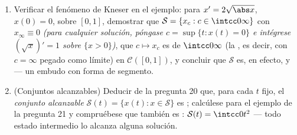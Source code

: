 \begin{problem}[{Problema de fin de semana --- existencia de soluciones
de
$x' = f(t, x)$ sin hipótesis de Lipschitz}]
\begin{enumerate}[resume]
        demostraremos.) \item Verificar el fenómeno de Kneser en el
        ejemplo: para $x' =
        2\sqrt{\abs x}$, $x(0) = 0$, sobre $[0, 1]$, demostrar que
        $\mathcal S = \{x_c : c \in \intcc0\infty\}$ con
        $x_\infty \equiv 0$ \emph{(para cualquier solución, póngase $c =
        \sup\{t : x(t) = 0\}$ e intégrese $(\sqrt x)' = 1$ sobre
        $\{x > 0\}$)}, que $c \mapsto x_c$ es
         de $\intcc0\infty$
        (la , es decir, con $c = \infty$ pegado como límite) en
        $\mathcal C([0,1])$, y concluir que $\mathcal S$ es, en efecto,
         y
         --- un embudo con
        forma de segmento. \item (Conjuntos alcanzables) Deducir de la
        pregunta 20 que, para cada $t$ fijo, el \emph{conjunto
        alcanzable} $\mathcal S(t) =
        \{x(t) : x \in \mathcal S\}$ es
        ; calcúlese para el
        ejemplo de la pregunta 21 y compruébese que también es
        :
        $\mathcal S(t) = \intcc0{t^2}$ --- todo estado intermedio lo
        alcanza alguna solución.
\end{enumerate}


\end{problem}
